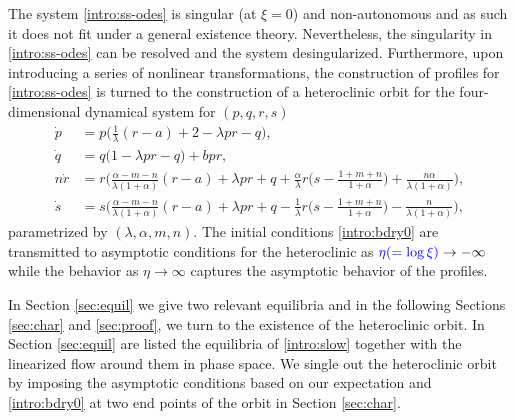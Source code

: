 \documentclass[a4paper,11pt]{article}
\def\blue{\color{blue}}
\theoremstyle{remark}
\begin{document}
The system \eqref{intro:ss-odes} is singular (at $\xi=0$) and non-autonomous and as such it does not fit under a general existence theory.
Nevertheless,  the singularity in \eqref{intro:ss-odes} can be resolved and the system desingularized. Furthermore, upon introducing a series of nonlinear transformations,  the construction of profiles for \eqref{intro:ss-odes} is turned to the
construction of a heteroclinic orbit for the four-dimensional dynamical system for $(p,q,r,s)$ 
\begin{equation}\label{intro:slow}\tag{S}
 \begin{aligned}
 \dot{p} &=p\Big(\frac{1}{\lambda}(r-a) + 2- \lambda p r -q\Big), \\
 \dot{q} &=q\Big(1 -\lambda p r -q\Big) + b p r,\\
 n\dot{r} &=r\Big(\frac{\alpha-m-n}{\lambda(1+\alpha)}(r-a) + \lambda pr + q +\frac{\alpha}{\lambda}r\big(s- \frac{1+m+n}{1+\alpha}\big) + \frac{n\alpha}{\lambda(1+\alpha)}\Big),\\
 \dot{s} &=s\Big(\frac{\alpha-m-n}{\lambda(1+\alpha)}(r-a) + \lambda pr + q - \frac{1}{\lambda}r\big(s- \frac{1+m+n}{1+\alpha}\big) - \frac{n}{\lambda(1+\alpha)}\Big),
 \end{aligned}
\end{equation}
parametrized by $(\lambda,\alpha,m,n)$. The initial conditions \eqref{intro:bdry0} are transmitted to asymptotic conditions for the heteroclinic
as ${\blue \eta(=\log\xi)} \to -\infty$ while the behavior as $\eta \to \infty$ captures the asymptotic behavior of the profiles.


{\blue In Section \ref{sec:equil} we give two relevant equilibria and in the following Sections} \ref{sec:char} and \ref{sec:proof}, we turn to the existence of the heteroclinic orbit. In Section  \ref{sec:equil} are listed
the equilibria of  \eqref{intro:slow} together with the linearized flow around them in phase space. {\blue We single out the heteroclinic orbit by imposing the asymptotic conditions based on our expectation and \eqref{intro:bdry0} at two end points of the orbit in Section \ref{sec:char}. }
\end{document}
